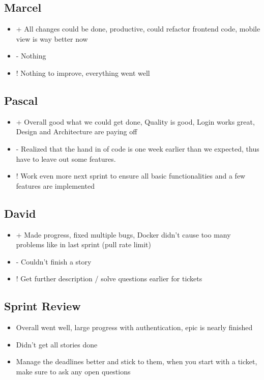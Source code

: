 \subsection{Marcel}
\begin{itemize}
    \item + All changes could be done, productive, could refactor frontend code, mobile view is way better now
    \item - Nothing
    \item ! Nothing to improve, everything went well
\end{itemize}

\subsection{Pascal}
\begin{itemize}
    \item + Overall good what we could get done, Quality is good, Login works great, Design and Architecture are paying off
    \item - Realized that the hand in of code is one week earlier than we expected, thus have to leave out some features.
    \item ! Work even more next sprint to ensure all basic functionalities and a few features are implemented
\end{itemize}

\subsection{David}
\begin{itemize}
    \item + Made progress, fixed multiple bugs, Docker didn't cause too many problems like in last sprint (pull rate limit)
    \item - Couldn't finish a story
    \item ! Get further description / solve questions earlier for tickets
\end{itemize}

\subsection{Sprint Review}
\begin{itemize}
    \item Overall went well, large progress with authentication, epic is nearly finished
    \item Didn't get all stories done
    \item Manage the deadlines better and stick to them, when you start with a ticket, make sure to ask any open questions
\end{itemize}
